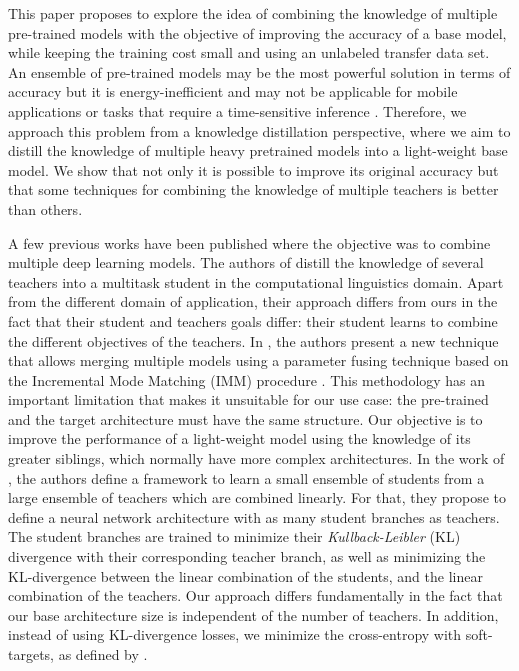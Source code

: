 \documentclass{elsarticle}
\begin{document}
	
	 This paper proposes to explore the idea of combining the knowledge of multiple pre-trained models with the objective of improving the accuracy of a base model, while keeping the training cost small and using an unlabeled transfer data set. 	An ensemble of pre-trained models may be the most powerful solution in terms of accuracy but it is energy-inefficient and may not be applicable for mobile applications or tasks that require a time-sensitive inference \citep{sanchez2020}. Therefore, we approach this problem from a knowledge distillation perspective, where we aim to distill the knowledge of multiple heavy pretrained models into a light-weight base model. We show that not only it is possible to improve its original accuracy but that some techniques for combining the knowledge of multiple teachers is better than others. 
	
	A few previous works have been published where the objective was to combine multiple deep learning models. The authors of \citep{liu2020} distill the knowledge of several teachers into a multitask student in the computational linguistics domain. Apart from the different domain of application, their approach differs from ours in the fact that their student and teachers goals differ: their student learns to combine the different objectives of the teachers. In \citep{geyer2019}, the authors present a new technique that allows merging multiple models using a parameter fusing technique based on the Incremental Mode Matching (IMM) procedure \citep{lee2017}. This methodology has an important limitation that makes it unsuitable for our use case: the pre-trained and the target architecture must have the same structure. Our objective is to improve the performance of a light-weight model using the knowledge of its greater siblings, which normally have more complex architectures. In the work of \citep{asif2019}, the authors define a framework to learn a small ensemble of students from a large ensemble of teachers which are combined linearly. For that, they propose to define a neural network architecture with as many student branches as teachers. The student branches are trained to minimize their \textit{Kullback-Leibler} (KL) divergence with their corresponding teacher branch, as well as minimizing the KL-divergence between the linear combination of the students, and the linear combination of the teachers. Our approach differs fundamentally in the fact that our base architecture size is independent of the number of teachers. In addition, instead of using KL-divergence losses, we minimize the cross-entropy with soft-targets, as defined by \citep{hinton2015}.
	
\end{document}
